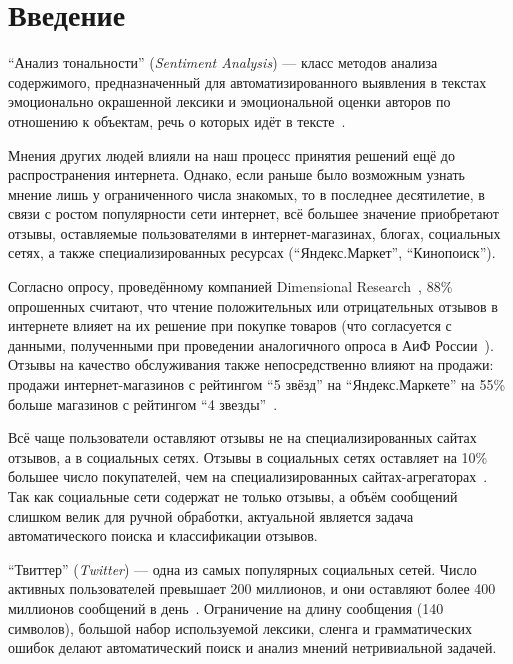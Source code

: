 \section*{Введение}

``Анализ тональности'' (\textit{Sentiment Analysis}) ---  класс методов анализа 
содержимого, предназначенный для автоматизированного выявления в текстах 
эмоционально окрашенной лексики и эмоциональной оценки авторов по 
отношению  к объектам, речь о которых идёт в тексте~\cite{wikisent}. 

Мнения других людей влияли на наш процесс принятия решений ещё до 
распространения интернета. Однако, если раньше было возможным узнать мнение 
лишь у ограниченного числа знакомых, то в последнее десятилетие, в связи с 
ростом популярности сети интернет, всё большее значение приобретают отзывы, 
оставляемые пользователями в интернет-магазинах, блогах, социальных сетях, а 
также специализированных ресурсах (``Яндекс.Маркет'', ``Кинопоиск''). 

Согласно опросу, проведённому компанией Dimensional Research~\cite{dimresearch}, 
88\% опрошенных считают, что чтение положительных или отрицательных 
отзывов в интернете влияет на их решение при покупке товаров (что согласуется с 
данными, полученными при проведении аналогичного опроса в АиФ России~\cite{aif}). 
Отзывы на качество обслуживания также непосредственно влияют на продажи: 
продажи интернет-магазинов с рейтингом ``5 звёзд'' на ``Яндекс.Маркете'' на 55\% 
больше магазинов с рейтингом ``4 звезды''~\cite{medianation}.

Всё чаще пользователи оставляют отзывы не на специализированных 
сайтах отзывов, а в социальных сетях. 
Отзывы в социальных сетях оставляет на 10\% большее число покупателей, чем на 
специализированных сайтах-агрегаторах~\cite{dimresearch}.
Так как социальные сети содержат не только отзывы, а объём сообщений слишком 
велик для ручной обработки, актуальной является задача автоматического поиска 
и классификации отзывов.
 
``Твиттер'' (\textit{Twitter}) --- одна из самых популярных социальных сетей. 
Число активных пользователей превышает 200 миллионов, и они оставляют более 
400 миллионов сообщений в день~\cite{twitter_users}. 
Ограничение на длину сообщения (140 символов), большой набор используемой 
лексики, сленга и грамматических ошибок делают автоматический поиск и анализ
мнений нетривиальной задачей.

